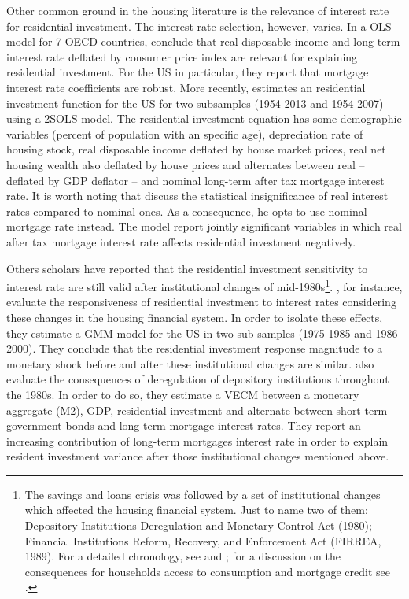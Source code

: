 \documentclass[12pt, a4paper]{article}
\begin{document}
Other common ground in the housing literature is the relevance of interest rate for residential investment.
The interest rate selection, however, varies.
In a OLS model for 7 OECD countries, \textcite{egebo_1990_MODEL} conclude that real disposable income and long-term interest rate deflated by consumer price index are relevant for explaining residential investment.
For the US in particular, they report that mortgage interest rate coefficients are robust.
More recently, \textcite{fair_macroeconometric_2018} estimates an residential investment function for the US for two subsamples (1954-2013 and 1954-2007) using a 2SOLS model.
The residential investment equation has some demographic variables (percent of population with an specific age), depreciation rate of housing stock, real disposable income deflated by house market prices, real net housing wealth also deflated by house prices and alternates between real -- deflated by GDP deflator -- and nominal long-term after tax mortgage interest rate.
It is worth noting that \textcite{fair_macroeconometric_2018} discuss the statistical insignificance of real interest rates compared to nominal ones.
As a consequence, he opts to use nominal mortgage rate instead.
The model report jointly significant variables in which real after tax mortgage interest rate affects residential investment negatively.

Others scholars have reported that the residential investment sensitivity to interest rate are still valid after institutional changes of mid-1980s\footnote{The savings and loans crisis was followed by a set of institutional changes which affected the housing financial system. Just to name two of them: Depository Institutions Deregulation and Monetary Control Act (1980); Financial Institutions Reform, Recovery, and Enforcement Act (FIRREA, 1989). For a detailed chronology, see  \textcite[Appendix B]{mccarthyMonetaryPolicyTransmission2002} and \textcite{green_american_2005}; for a discussion on the consequences for households access to consumption and mortgage credit see \textcite{federal_deposit_insurance_corporation_savings_1997,wall_too_2010}.}.
\textcite{mccarthyMonetaryPolicyTransmission2002}, for instance, evaluate the responsiveness of residential investment to interest rates considering these changes in the housing financial system.
In order to isolate these effects, they estimate  a GMM model for the US in two sub-samples (1975-1985 and 1986-2000).
They conclude that the residential investment response magnitude to a monetary shock before and after these institutional changes are similar.
\textcite{gauger_residential_2003} also evaluate the consequences of deregulation of depository institutions throughout the 1980s.
In order to do so, they estimate a VECM between a monetary aggregate (M2), GDP, residential investment and alternate between short-term government bonds and long-term mortgage interest rates.
They report an increasing contribution of long-term mortgages interest rate in order to explain resident investment variance after those institutional changes mentioned above.
\end{document}
